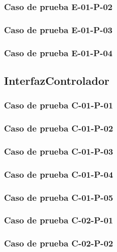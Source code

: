 \documentclass[10pt,a4paper]{article}
\begin{document}
			\subsubsection{Caso de prueba E-01-P-02}

			\subsubsection{Caso de prueba E-01-P-03}

			\subsubsection{Caso de prueba E-01-P-04}

	\subsection{InterfazControlador}
			\subsubsection{Caso de prueba C-01-P-01}

			\subsubsection{Caso de prueba C-01-P-02}

			\subsubsection{Caso de prueba C-01-P-03}

			\subsubsection{Caso de prueba C-01-P-04}

			\subsubsection{Caso de prueba C-01-P-05}

			\subsubsection{Caso de prueba C-02-P-01}

			\subsubsection{Caso de prueba C-02-P-02}
\end{document}
